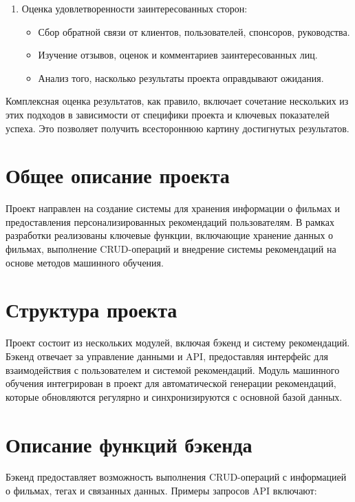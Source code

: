 \begin{enumerate}
\begin{itemize}
        \end{itemize}
    \item Оценка удовлетворенности заинтересованных сторон:
        \begin{itemize}
            \item Сбор обратной связи от клиентов, пользователей, спонсоров, руководства.
            \item Изучение отзывов, оценок и комментариев заинтересованных лиц.
            \item Анализ того, насколько результаты проекта оправдывают ожидания.
        \end{itemize}
\end{enumerate}

Комплексная оценка результатов, как правило, включает сочетание нескольких из этих подходов в зависимости от специфики проекта и ключевых показателей успеха. Это позволяет получить всестороннюю картину достигнутых результатов.

\section{Общее описание проекта}

Проект направлен на создание системы для хранения информации о фильмах и предоставления персонализированных рекомендаций пользователям. В рамках разработки реализованы ключевые функции, включающие хранение данных о фильмах, выполнение CRUD-операций и внедрение системы рекомендаций на основе методов машинного обучения.

\section{Структура проекта}

Проект состоит из нескольких модулей, включая бэкенд и систему рекомендаций. Бэкенд отвечает за управление данными и API, предоставляя интерфейс для взаимодействия с пользователем и системой рекомендаций. Модуль машинного обучения интегрирован в проект для автоматической генерации рекомендаций, которые обновляются регулярно и синхронизируются с основной базой данных.

\section{Описание функций бэкенда}

Бэкенд предоставляет возможность выполнения CRUD-операций с информацией о фильмах, тегах и связанных данных. Примеры запросов API включают:

